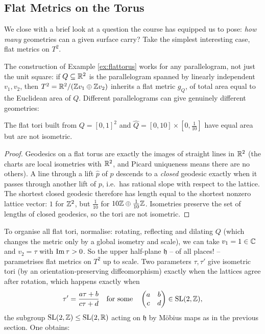 \documentclass[a4paper]{scrartcl}
\begin{document}
\subsection{Flat Metrics on the Torus}

We close with a brief look at a question the course has equipped us to pose: \emph{how many} geometries can a given surface carry? Take the simplest interesting case, flat metrics on $T^2$.

The construction of Example \ref{ex:flattorus} works for any parallelogram, not just the unit square: if $Q \subseteq \mathbb{R}^2$ is the parallelogram spanned by linearly independent $v_1, v_2$, then $T^2 = \mathbb{R}^2 / (\mathbb{Z} v_1 \oplus \mathbb{Z} v_2)$ inherits a flat metric $g_Q$, of total area equal to the Euclidean area of $Q$. Different parallelograms can give genuinely different geometries:

\begin{lemma}
    The flat tori built from $Q = [0,1]^2$ and $\hat Q = [0, 10] \times [0, \tfrac{1}{10}]$ have equal area but are not isometric.
\end{lemma}
\begin{proof}
    Geodesics on a flat torus are exactly the images of straight lines in $\mathbb{R}^2$ (the charts are local isometries with $\mathbb{R}^2$, and Picard uniqueness means there are no others). A line through a lift $\hat p$ of $p$ descends to a \emph{closed} geodesic exactly when it passes through another lift of $p$, i.e.\ has rational slope with respect to the lattice. The shortest closed geodesic therefore has length equal to the shortest nonzero lattice vector: $1$ for $\mathbb{Z}^2$, but $\tfrac{1}{10}$ for $10\mathbb{Z} \oplus \tfrac{1}{10}\mathbb{Z}$. Isometries preserve the set of lengths of closed geodesics, so the tori are not isometric.
\end{proof}

To organise all flat tori, normalise: rotating, reflecting and dilating $Q$ (which changes the metric only by a global isometry and scale), we can take $v_1 = 1 \in \mathbb{C}$ and $v_2 = \tau$ with $\operatorname{Im} \tau > 0$. So the upper half-plane $\mathfrak{h}$ -- of all places! -- parametrises flat metrics on $T^2$ up to scale. Two parameters $\tau, \tau'$ give isometric tori (by an orientation-preserving diffeomorphism) exactly when the lattices agree after rotation, which happens exactly when
$$
\tau' = \frac{a \tau + b}{c \tau + d} \quad \text{for some} \quad \begin{pmatrix} a & b \\ c & d \end{pmatrix} \in \operatorname{SL}(2, \mathbb{Z}),
$$
the subgroup $\operatorname{SL}(2, \mathbb{Z}) \leq \operatorname{SL}(2, \mathbb{R})$ acting on $\mathfrak{h}$ by M\"obius maps as in the previous section. One obtains:
\end{document}
